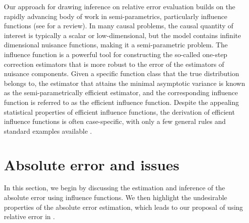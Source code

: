 \documentclass{article}
\theoremstyle{plain}
\theoremstyle{definition}
\theoremstyle{plain}
\begin{document}
Our approach for drawing inference on relative error evaluation builds on the rapidly advancing body of work in semi-parametrics, particularly influence functions \parencite{van2000asymptotic, robins2008higher} (see \cite{kennedy2022semiparametric} for a review).  
In many causal problems, the causal quantity of interest is typically a scalar or low-dimensional, but the model contains infinite dimensional nuisance functions, making it a semi-parametric problem.
The influence function is a powerful tool for constructing the so-called one-step correction estimators that is more robust to the error of the estimators of nuisance components.
Given a specific function class that the true distribution belongs to, the estimator that attains the minimal asymptotic variance is known as the semi-parametrically efficient estimator, and the corresponding influence function is referred to as the efficient influence function. Despite the appealing statistical properties of efficient influence functions, the derivation of efficient influence functions is often case-specific, with only a few general rules and standard examples available \parencite{kennedy2022semiparametric}.


\section{Absolute error and issues}\label{sec:absolute.error}

In this section, we begin by discussing the estimation and inference of the absolute error using influence functions. We then highlight the undesirable properties of the absolute error estimation, which leads to our proposal of using relative error in .
\end{document}
